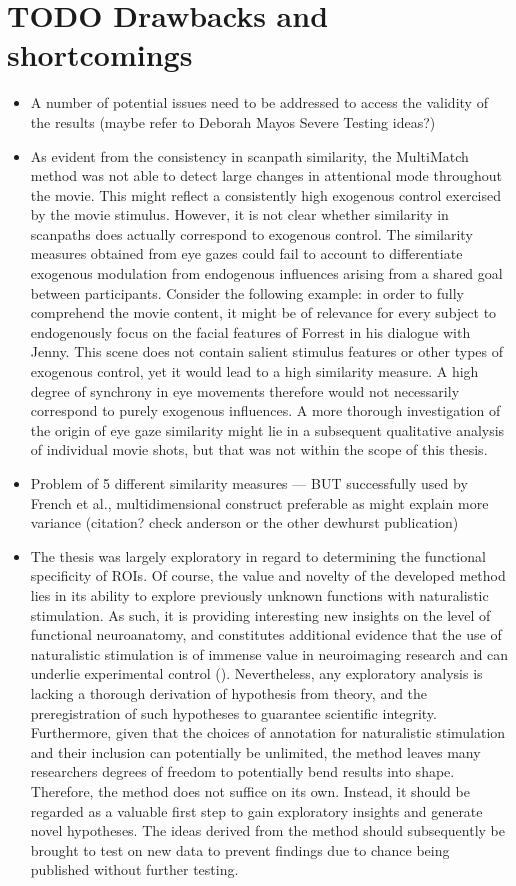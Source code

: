 \documentclass[a4paper, 12pt]{scrreprt}
\begin{document}
	



\section{TODO Drawbacks and shortcomings}
\begin{itemize}
	\item A number of potential issues need to be addressed to access the validity of the results (maybe refer to Deborah Mayos Severe Testing ideas?)
	\item As evident from the consistency in scanpath similarity, the MultiMatch method was not able to detect large changes in attentional mode throughout the movie. This might reflect a consistently high exogenous control exercised by the movie stimulus. However, it is not clear whether similarity in scanpaths does actually correspond to exogenous control. The similarity measures obtained from eye gazes could fail to account to differentiate exogenous modulation from endogenous influences arising from a shared goal between participants. Consider the following example: in order to fully comprehend the movie content, it might be of relevance for every subject to endogenously focus on the facial features of Forrest in his dialogue with Jenny. This scene does not contain salient stimulus features or other types of exogenous control, yet it would lead to a high similarity measure. A high degree of synchrony in eye movements therefore would not necessarily correspond to purely exogenous influences. A more thorough investigation of the origin of eye gaze similarity might lie in a subsequent qualitative analysis of individual movie shots, but that was not within the scope of this thesis.
	\item Problem of 5 different similarity measures --- BUT successfully used by French et al., multidimensional construct preferable as might explain more variance (citation? check anderson or the other dewhurst publication) 
	\item The thesis was largely exploratory in regard to determining the functional specificity of ROIs. Of course, the value and novelty of the developed method lies in its ability to explore previously unknown functions with naturalistic stimulation. As such, it is providing interesting new insights on the level of functional neuroanatomy, and constitutes additional evidence that the use of naturalistic stimulation is of immense value in neuroimaging research and can underlie experimental control (\cite{hasson2004intersubject}). Nevertheless, any exploratory analysis is lacking a thorough derivation of hypothesis from theory, and the preregistration of such hypotheses to guarantee scientific integrity. Furthermore, given that the choices of annotation for naturalistic stimulation and their inclusion can potentially be unlimited, the method leaves many researchers degrees of freedom to potentially bend results into shape. Therefore, the method does not suffice on its own. Instead, it should be regarded as a valuable first step to gain exploratory insights and generate novel hypotheses. The ideas derived from the method should subsequently be brought to test on new data to prevent findings due to chance being published without further testing. 

\end{itemize}
\end{document}
